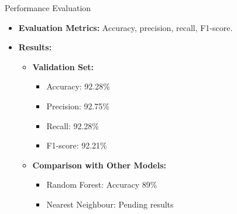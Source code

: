 \documentclass{beamer}
\begin{document}
\begin{frame}{Performance Evaluation}
  \begin{itemize}
    \item \textbf{Evaluation Metrics:} Accuracy, precision, recall, F1-score.
    \item \textbf{Results:}
      \begin{itemize}
        \item \textbf{Validation Set:}
          \begin{itemize}
            \item Accuracy: 92.28\%
            \item Precision: 92.75\%
            \item Recall: 92.28\%
            \item F1-score: 92.21\%
          \end{itemize}
        \item \textbf{Comparison with Other Models:}
          \begin{itemize}
            \item Random Forest: Accuracy 89\%
            \item Nearest Neighbour: Pending results
          \end{itemize}
      \end{itemize}
  \end{itemize}
\end{frame}
\end{document}

